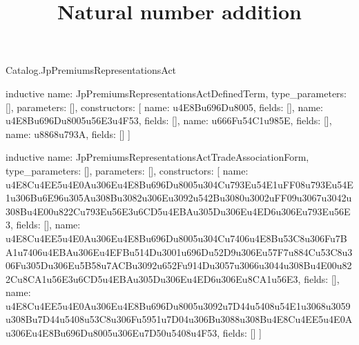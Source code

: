\begin{lexlean}{Catalog.JpPremiumsRepresentationsAct}
\title{Natural number addition}
\begin{semanticmodule}
inductive{
  name: JpPremiumsRepresentationsActDefinedTerm,
  type_parameters: [],
  parameters: [],
  constructors: [
    {name: u4E8Bu696Du8005, fields: []},
    {name: u4E8Bu696Du8005u56E3u4F53, fields: []},
    {name: u666Fu54C1u985E, fields: []},
    {name: u8868u793A, fields: []}
  ]
}

inductive{
  name: JpPremiumsRepresentationsActTradeAssociationForm,
  type_parameters: [],
  parameters: [],
  constructors: [
    {name: u4E8Cu4EE5u4E0Au306Eu4E8Bu696Du8005u304Cu793Eu54E1uFF08u793Eu54E1u306Bu6E96u305Au308Bu3082u306Eu3092u542Bu3080u3002uFF09u3067u3042u308Bu4E00u822Cu793Eu56E3u6CD5u4EBAu305Du306Eu4ED6u306Eu793Eu56E3, fields: []},
    {name: u4E8Cu4EE5u4E0Au306Eu4E8Bu696Du8005u304Cu7406u4E8Bu53C8u306Fu7BA1u7406u4EBAu306Eu4EFBu514Du3001u696Du52D9u306Eu57F7u884Cu53C8u306Fu305Du306Eu5B58u7ACBu3092u652Fu914Du3057u3066u3044u308Bu4E00u822Cu8CA1u56E3u6CD5u4EBAu305Du306Eu4ED6u306Eu8CA1u56E3, fields: []},
    {name: u4E8Cu4EE5u4E0Au306Eu4E8Bu696Du8005u3092u7D44u5408u54E1u3068u3059u308Bu7D44u5408u53C8u306Fu5951u7D04u306Bu3088u308Bu4E8Cu4EE5u4E0Au306Eu4E8Bu696Du8005u306Eu7D50u5408u4F53, fields: []}
  ]
}


\end{semanticmodule}
\end{lexlean}
